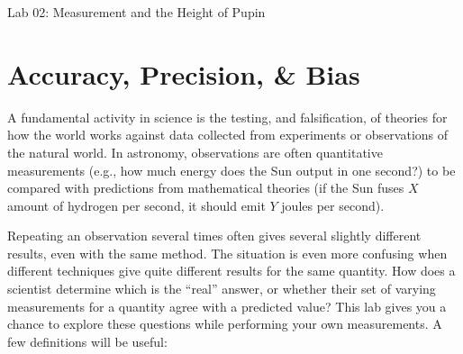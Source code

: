 \documentclass[11pt]{article}%
\newcommand{\labnumber}{02}  %
\begin{document}

\begin{center}
    \LARGE Lab \labnumber: Measurement and the Height of Pupin
\end{center}







\section{Accuracy, Precision, \& Bias}

\smallskip

A fundamental activity in science is the testing, and falsification, of
theories for how the world works against data collected from experiments or
observations of the natural world.
In astronomy, observations are often quantitative measurements (e.g., how much
energy does the Sun output in one second?) to be compared with predictions from
mathematical theories (if the Sun fuses $X$ amount of hydrogen per second,
it should emit $Y$ joules per second).

Repeating an observation several times often gives several slightly
different results, even with the same method. The situation is even
more confusing when different techniques give quite different results
for the same quantity. How does a scientist determine which is the
``real'' answer, or whether their set of varying measurements for a
quantity agree with a predicted value? This lab gives you a chance to
explore these questions while performing your own measurements.
A few definitions will be useful:
\end{document}

